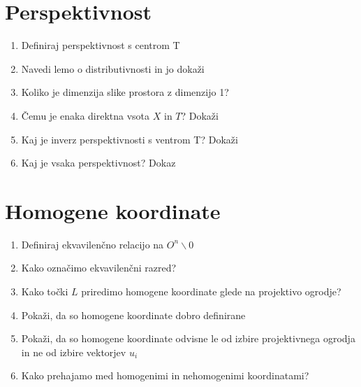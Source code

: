 \documentclass{article}
\begin{document}
    \section{Perspektivnost}
    \begin{enumerate}
        \item Definiraj perspektivnost s centrom T
        \item Navedi lemo o distributivnosti in jo dokaži
        \item Koliko je dimenzija slike prostora z dimenzijo 1?
        \item Čemu je enaka direktna vsota $X$ in $T$? Dokaži
        \item Kaj je inverz perspektivnosti s ventrom T? Dokaži
        \item Kaj je vsaka perspektivnost? Dokaz
    \end{enumerate}

    \section{Homogene koordinate}
    \begin{enumerate}
        \item Definiraj ekvavilenčno relacijo na $O^n \backslash {0}$ 
        \item Kako označimo ekvavilenčni razred?
        \item Kako točki $L$ priredimo homogene koordinate glede na projektivo ogrodje?
        \item Pokaži, da so homogene koordinate dobro definirane
        \item Pokaži, da so homogene koordinate odvisne le od izbire projektivnega ogrodja in ne od izbire vektorjev $u_i$
        \item Kako prehajamo med homogenimi in nehomogenimi koordinatami?
    \end{enumerate}
\end{document}
